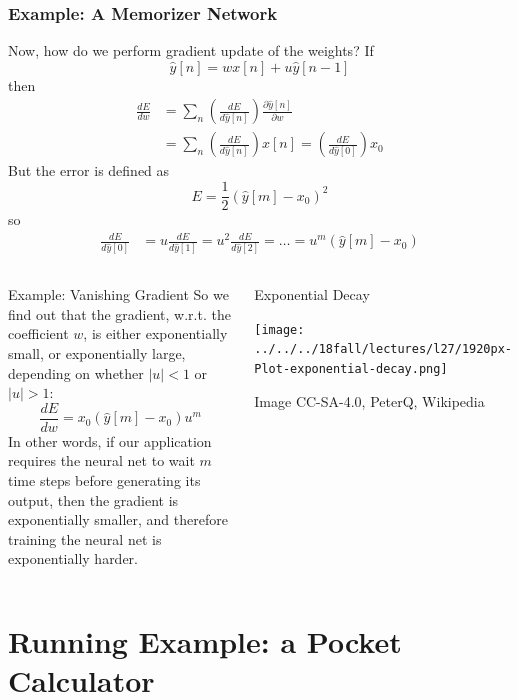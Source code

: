 \documentclass{beamer}
\begin{document}
\begin{frame}
  \frametitle{Example: A Memorizer Network}

  Now, how do we perform gradient update of the weights?  If
  \[
  \hat{y}[n] = w x[n]+u\hat{y}[n-1]
  \]
  then
  \begin{align*}
    \frac{dE}{dw} &= \sum_n \left(\frac{dE}{d\hat{y}[n]}\right)\frac{\partial \hat{y}[n]}{\partial w} \\
   &= \sum_n \left(\frac{dE}{d\hat{y}[n]}\right)x[n]
    = \left(\frac{dE}{d\hat{y}[0]}\right)x_0
  \end{align*}
  But the error is defined as
  \[
  E=\frac{1}{2}\left(\hat{y}[m]-x_0\right)^2
  \]
  so
  \begin{align*}
    \frac{dE}{d\hat{y}[0]} &= u\frac{dE}{d\hat{y}[1]} = u^2\frac{dE}{d\hat{y}[2]} = \ldots
    = u^m \left(\hat{y}[m]-x_0\right)
  \end{align*}
\end{frame}
  
\begin{frame}
  \begin{columns}
    \column{2.75in}
    \begin{block}{Example: Vanishing Gradient}
      So we find out that the gradient, w.r.t. the coefficient $w$, is
      either exponentially small, or exponentially large, depending on
      whether $|u|<1$ or $|u|>1$:
      \[
      \frac{dE}{dw} = x_0\left(\hat{y}[m]-x_0\right) u^m
      \]
      In other words, if our application requires the neural net to
      wait $m$ time steps before generating its output, then the
      gradient is exponentially smaller, and therefore training the
      neural net is exponentially harder.
    \end{block}
    \column{1.75in}
    \begin{block}{Exponential Decay}
      \centerline{\texttt{[image: ../../../18fall/lectures/l27/1920px-Plot-exponential-decay.png]}}
      \begin{tiny}Image CC-SA-4.0, PeterQ, Wikipedia\end{tiny}
    \end{block}
    \end{columns}
\end{frame}

\section[Example]{Running Example: a Pocket Calculator}
\setcounter{subsection}{1}
\end{document}
